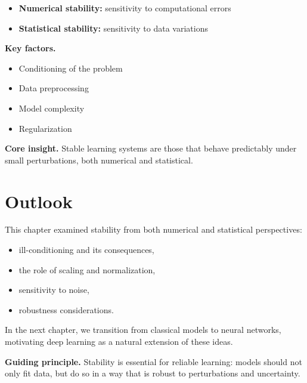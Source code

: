 \begin{itemize}
    \item \textbf{Numerical stability:} sensitivity to computational errors
    \item \textbf{Statistical stability:} sensitivity to data variations
\end{itemize}

\medskip

\noindent
\textbf{Key factors.}
\begin{itemize}
    \item Conditioning of the problem
    \item Data preprocessing
    \item Model complexity
    \item Regularization
\end{itemize}

\medskip

\noindent
\textbf{Core insight.}  
Stable learning systems are those that behave predictably under small perturbations, both numerical and statistical.

\section{Outlook}

This chapter examined stability from both numerical and statistical perspectives:
\begin{itemize}
    \item ill-conditioning and its consequences,
    \item the role of scaling and normalization,
    \item sensitivity to noise,
    \item robustness considerations.
\end{itemize}

\medskip

In the next chapter, we transition from classical models to neural networks, motivating deep learning as a natural extension of these ideas.

\medskip

\noindent
\textbf{Guiding principle.}  
Stability is essential for reliable learning: models should not only fit data, but do so in a way that is robust to perturbations and uncertainty.
